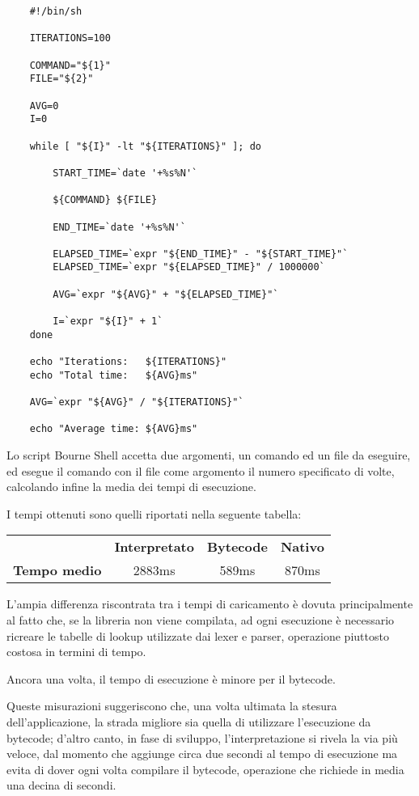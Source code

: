 \begin{lstlisting}
    #!/bin/sh

    ITERATIONS=100

    COMMAND="${1}"
    FILE="${2}"

    AVG=0
    I=0

    while [ "${I}" -lt "${ITERATIONS}" ]; do

        START_TIME=`date '+%s%N'`

        ${COMMAND} ${FILE}

        END_TIME=`date '+%s%N'`

        ELAPSED_TIME=`expr "${END_TIME}" - "${START_TIME}"`
        ELAPSED_TIME=`expr "${ELAPSED_TIME}" / 1000000`

        AVG=`expr "${AVG}" + "${ELAPSED_TIME}"`

        I=`expr "${I}" + 1`
    done

    echo "Iterations:   ${ITERATIONS}"
    echo "Total time:   ${AVG}ms"

    AVG=`expr "${AVG}" / "${ITERATIONS}"`

    echo "Average time: ${AVG}ms"
\end{lstlisting}

Lo script Bourne Shell accetta due argomenti, un comando ed un file da
eseguire, ed esegue il comando con il file come argomento il numero
specificato di volte, calcolando infine la media dei tempi di esecuzione.

I tempi ottenuti sono quelli riportati nella seguente tabella:

\vspace{3mm}
\begin{center}
\begin{tabular}{r c c c}
&
\textbf{Interpretato}
&
\textbf{Bytecode}
&
\textbf{Nativo}
\\
\textbf{Tempo medio}
&
2883ms
&
589ms
&
870ms
\\
\end{tabular}
\end{center}

L'ampia differenza riscontrata tra i tempi di caricamento \`e dovuta
principalmente al fatto che, se la libreria non viene compilata, ad ogni
esecuzione \`e necessario ricreare le tabelle di lookup utilizzate dai
lexer e parser, operazione piuttosto costosa in termini di tempo.

Ancora una volta, il tempo di esecuzione \`e minore per il bytecode.

Queste misurazioni suggeriscono che, una volta ultimata la stesura
dell'applicazione, la strada migliore sia quella di utilizzare
l'esecuzione da bytecode; d'altro canto, in fase di sviluppo,
l'interpretazione si rivela la via pi\`u veloce, dal momento che
aggiunge circa due secondi al tempo di esecuzione ma evita di dover
ogni volta compilare il bytecode, operazione che richiede in media
una decina di secondi.
